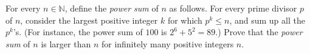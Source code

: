 For every $n\in\mathbb{N}$, define the \textit{power sum} of $n$ as follows. For every prime divisor $p$ of $n$, consider the largest positive integer $k$ for which $p^k\le n$, and sum up all the $p^k$'s. (For instance, the power sum of $100$ is $2^6+5^2=89$.) Prove that the \textit{power sum} of $n$ is larger than $n$ for infinitely many positive integers $n$.